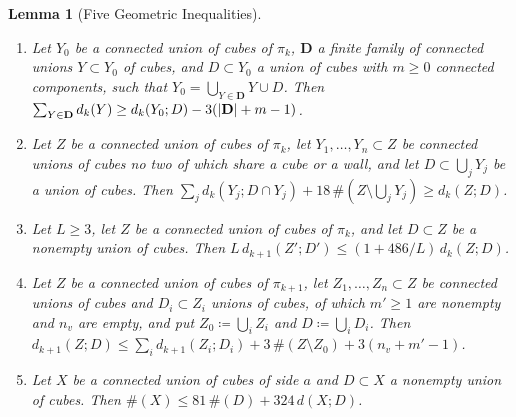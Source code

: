 \documentclass[11pt]{preprint}
\DeclarePairedDelimiter{\abs}{\lvert}{\rvert}
\numberwithin{equation}{section}
\newtheorem{lemma}{Lemma}[section]
\theoremstyle{definition}
\theoremstyle{remark}
\theoremstyle{plain}
\begin{document}
\begin{lemma}[Five Geometric Inequalities]\label{lem:contracted-geometry}
\begin{enumerate}[label=(\roman*)]
\item Let $Y_0$ be a connected union of cubes of $\pi_k$, $\mathbf D$ a finite family of connected unions $Y \subset Y_0$ of cubes, and $D \subset Y_0$ a union of cubes with $m \geq 0$ connected components, such that $Y_0 = \bigcup_{Y \in \mathbf D}Y \cup D$. Then $\sum_{Y \in \mathbf D}d_k(Y) \geq d_k(Y_0; D) - 3(\abs{\mathbf D} + m - 1)$.
\item Let $Z$ be a connected union of cubes of $\pi_k$, let $Y_1, \dots, Y_n \subset Z$ be connected unions of cubes no two of which share a cube or a wall, and let $D \subset \bigcup_jY_j$ be a union of cubes. Then $\sum_jd_k(Y_j; D \cap Y_j) + 18\,\#(Z \setminus \bigcup_jY_j) \geq d_k(Z; D)$.
\item Let $L \geq 3$, let $Z$ be a connected union of cubes of $\pi_k$, and let $D \subset Z$ be a nonempty union of cubes. Then $L\,d_{k+1}(Z'; D') \leq (1 + 486/L)\,d_k(Z; D)$.
\item Let $Z$ be a connected union of cubes of $\pi_{k+1}$, let $Z_1, \dots, Z_n \subset Z$ be connected unions of cubes and $D_i \subset Z_i$ unions of cubes, of which $m' \geq 1$ are nonempty and $n_v$ are empty, and put $Z_0 \coloneqq \bigcup_iZ_i$ and $D \coloneqq \bigcup_iD_i$. Then $d_{k+1}(Z; D) \leq \sum_id_{k+1}(Z_i; D_i) + 3\,\#(Z \setminus Z_0) + 3(n_v + m' - 1)$.
\item Let $X$ be a connected union of cubes of side $a$ and $D \subset X$ a nonempty union of cubes. Then $\#(X) \leq 81\,\#(D) + 324\,d(X; D)$.
\end{enumerate}
\end{lemma}
\end{document}
